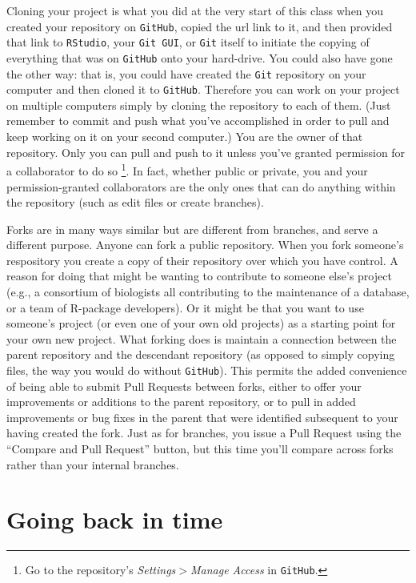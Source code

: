 \documentclass[12pt,letterpaper]{article}
\begin{document}
Cloning your project is what you did at the very start of this class when you created your repository on \texttt{GitHub}, copied the url link to it, and then provided that link to \texttt{RStudio}, your \texttt{Git GUI}, or \texttt{Git} itself to initiate the copying of everything that was on \texttt{GitHub} onto your hard-drive.
You could also have gone the other way:  that is, you could have created the 
\texttt{Git} repository on your computer and then cloned it to \texttt{GitHub}.
Therefore you can work on your project on multiple computers simply by 
cloning the repository to each of them.
(Just remember to commit and push what you've accomplished in order to pull 
and keep working on it on your second computer.)
You are the owner of that repository.
Only you can pull and push to it unless you've granted permission for a 
collaborator to do so
\unskip
\footnote{Go to the repository's \emph{Settings$>$Manage Access} in
	\texttt{GitHub}.}.
In fact, whether public or private, you and your permission-granted 
collaborators are the only ones that can do anything within the repository
(such as edit files or create branches).

Forks are in many ways similar but are different from branches,
and serve a different purpose.
Anyone can fork a public repository.
When you fork someone's respository you create a copy of their repository over which you have control.
A reason for doing that might be wanting to contribute to someone else's 
project (e.g., a consortium of biologists all contributing to the maintenance of a 
database, or a team of R-package developers).
Or it might be that you want to use someone's project
(or even one of your own old projects) 
as a starting point for your own new project.
What forking does is maintain a connection between the parent repository and 
the descendant repository
(as opposed to simply copying files,
the way you would do without \texttt{GitHub}).
This permits the added convenience of being able to submit Pull Requests 
between forks, 
either to offer your improvements or additions to the parent repository, 
or to pull in added improvements or bug fixes in the parent that were identified 
subsequent to your having created the fork.
Just as for branches, you issue a Pull Request using the ``Compare and Pull Request'' button, but this time you'll compare across forks rather than your internal branches.



\section{Going back in time}
\end{document}
